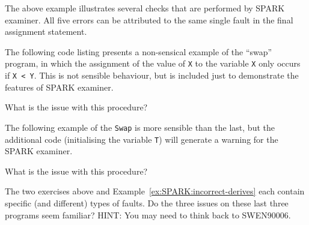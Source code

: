 The above example illustrates several checks that are performed by SPARK examiner. All five errors can be attributed to the same single fault in the final assignment statement. 
 

\begin{exercise}

The following code listing presents a non-sensical example of the ``swap'' program, in which the assignment of the value of \texttt{X} to the variable \texttt{X} only occurs if \texttt{X < Y}. This is not sensible behaviour, but is included just to demonstrate the features of SPARK examiner.





What is the issue with this procedure? 

\end{exercise}


\begin{exercise}
 
The following example of the \texttt{Swap} is more sensible than the last, but the additional code (initialising the variable \texttt{T}) will generate a warning for the SPARK examiner.






What is the issue with this procedure?
\end{exercise}

\begin{exercise}

The two exercises above and Example~\ref{ex:SPARK:incorrect-derives} each contain specific (and different) types of faults. Do the three issues on these last three programs seem familiar? HINT: You may need to think back to SWEN90006.

\end{exercise}

